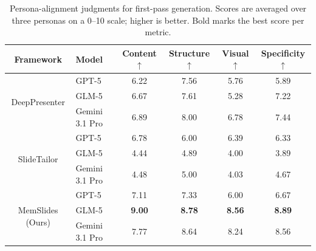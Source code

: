 \begin{table}[t]
\centering
\small
\setlength{\tabcolsep}{6pt}
\renewcommand{\arraystretch}{1.0}
\caption{Persona-alignment judgments for first-pass generation. Scores are
averaged over three personas on a 0--10 scale; higher is better. Bold marks the
best score per metric.}
\label{tab:profile_memory_v6_bestof_main}
\begin{tabular}{clcccc}
\toprule
Framework & Model & Content $\uparrow$ & Structure $\uparrow$ & Visual $\uparrow$ & Specificity $\uparrow$ \\
\midrule
\multirow{3}{*}{\centering DeepPresenter} & GPT-5 & 6.22 & 7.56 & 5.76 & 5.89 \\
& GLM-5 & 6.67 & 7.61 & 5.28 & 7.22 \\
& Gemini 3.1 Pro & 6.89 & 8.00 & 6.78 & 7.44 \\
\midrule
\multirow{3}{*}{\centering SlideTailor} & GPT-5 & 6.78 & 6.00 & 6.39 & 6.33 \\
& GLM-5 & 4.44 & 4.89 & 4.00 & 3.89 \\
& Gemini 3.1 Pro & 4.48 & 5.00 & 4.03 & 4.67 \\
\midrule
\multirow{3}{*}{\centering MemSlides (Ours)} & GPT-5 & 7.11 & 7.33 & 6.00 & 6.67 \\
& GLM-5 & \textbf{9.00} & \textbf{8.78} & \textbf{8.56} & \textbf{8.89} \\
& Gemini 3.1 Pro & 7.77 & 8.64 & 8.24 & 8.56 \\
\bottomrule
\end{tabular}
\end{table}
